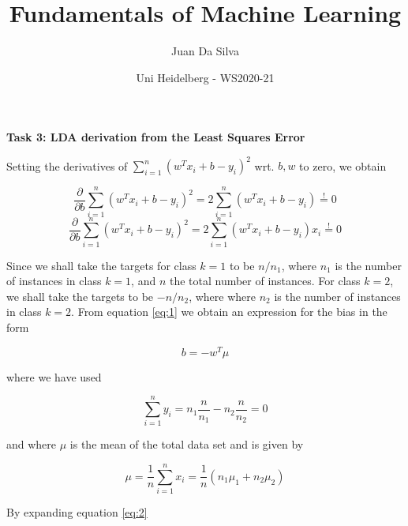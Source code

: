 \documentclass[10pt]{article}
\title{Fundamentals of Machine Learning}
\author{Juan Da Silva}
\date{Uni Heidelberg - WS2020-21}
\begin{document}
\maketitle

\noindent\textbf{Task 3: LDA derivation from the Least Squares Error}

\noindent Setting the derivatives of $\sum_{i=1}^n\left(w^Tx_i+b-y_i\right)^2$ wrt. $b, w$ to zero, we obtain

\begin{equation} \label{eq:1}
    \frac{\partial}{\partial b}\sum_{i=1}^n\left(w^Tx_i+b-y_i\right)^2 = 2\sum_{i=1}^n\left(w^Tx_i+b-y_i\right) \stackrel{!}{=} 0
\end{equation}
\begin{equation} \label{eq:2}
    \frac{\partial}{\partial b}\sum_{i=1}^n\left(w^Tx_i+b-y_i\right)^2 = 2\sum_{i=1}^n\left(w^Tx_i+b-y_i\right)x_i \stackrel{!}{=} 0
\end{equation}

\noindent Since we shall take the targets for class $k=1$ to be $n/n_1$, where $n_1$ is the number of instances in class $k=1$, and $n$ the total number of instances. For class $k=2$, we shall take the targets to be $-n/n_2$, where where $n_2$ is the number of instances in class $k=2$. From equation \ref{eq:1} we obtain an expression for the bias in the form

\begin{equation}
    b = -w^T\mu
\end{equation}

\noindent where we have used

\begin{equation}
    \sum_{i=1}^ny_i = n_1 \frac{n}{n_1}-n_2 \frac{n}{n_2}=0
\end{equation}

\noindent and where $\mu$ is the mean of the total data set and is given by

\begin{equation}
    \mu = \frac{1}{n}\sum_{i=1}^n x_i = \frac{1}{n}\left(n_1\mu_1 + n_2\mu_2  \right)
\end{equation}

\noindent By expanding equation \ref{eq:2}
\end{document}
